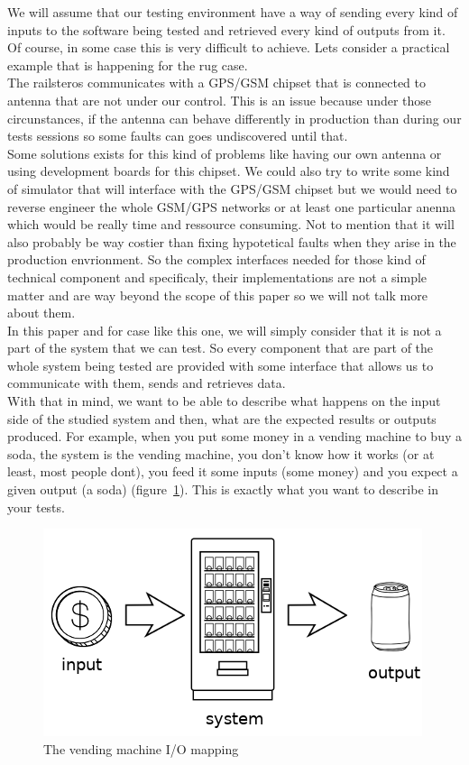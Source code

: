 \documentclass[12pt]{article}
\begin{document}
We will assume that our testing environment have a way of sending every kind of inputs to the software being tested and retrieved every kind of outputs from it. Of course, in some case this is very difficult to achieve. Lets consider a practical example that is happening for the \gls{rug} case.\\

The \gls{railsteros} communicates with a GPS/GSM chipset that is connected to antenna that are not under our control. This is an issue because under those circunstances, if the antenna can behave differently in production than during our tests sessions so some faults can goes undiscovered until that.\\

Some solutions exists for this kind of problems like having our own antenna or using development boards for this chipset. We could also try to write some kind of simulator that will interface with the GPS/GSM chipset but we would need to reverse engineer the whole GSM/GPS networks or at least one particular anenna which would be really time and ressource consuming. Not to mention that it will also probably be way costier than fixing hypotetical faults when they arise in the production envrionment. So the complex interfaces needed for those kind of technical component and specificaly, their implementations are not a simple matter and are way beyond the scope of this paper so we will not talk more about them. \\

In this paper and for case like this one, we will simply consider that it is not a part of the system that we can test. So every component that are part of the whole system being tested are provided with some interface that allows us to communicate with them, sends and retrieves data.\\

With that in mind, we want to be able to describe what happens on the input side of the studied system and then, what are the expected results or outputs produced. For example, when you put some money in a vending machine to buy a soda, the system is the vending machine, you don't know how it works (or at least, most people dont), you feed it some inputs (some money) and you expect a given output (a soda) (figure~\ref{vm-io}). This is exactly what you want to describe in your tests.\\

\begin{figure}
    \centering
    \includegraphics[scale=0.8]{vending-io.png}
    \caption{The vending machine I/O mapping}
    \label{vm-io}
\end{figure}
\end{document}
